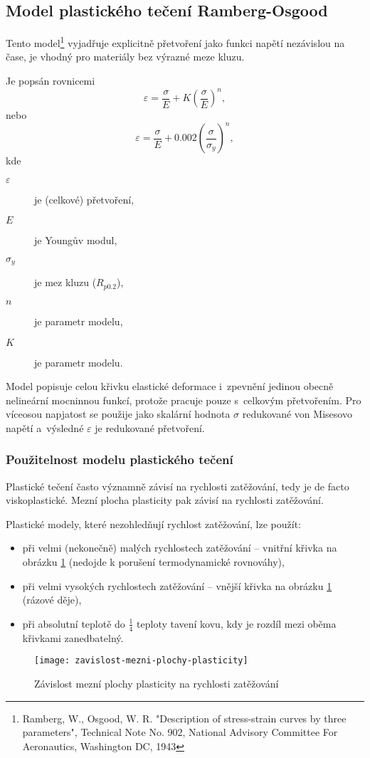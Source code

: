
\subsection{Model plastického tečení Ramberg-Osgood}\label{sec:ramberg-osgood}
Tento model\footnote{Ramberg, W., Osgood, W. R. "Description of stress-strain curves by three parameters", Technical Note No. 902, National Advisory Committee For Aeronautics, Washington DC, 1943} vyjadřuje explicitně přetvoření jako funkci napětí nezávislou na čase, je vhodný pro materiály bez výrazné meze kluzu.

Je popsán rovnicemi
\begin{equation}
	\varepsilon = \frac{\sigma}{E} + K \left( \frac{\sigma}{E} \right)^n,
\end{equation}
nebo
\begin{equation}
	\varepsilon = \frac{\sigma}{E} + 0.002 \left( \frac{\sigma}{\sigma_y} \right)^n,
\end{equation}
kde
\begin{description}
	\item[$\varepsilon$] je (celkové) přetvoření,
	\item[$E$] je Youngův modul,
	\item[$\sigma_y$] je mez kluzu ($R_{p0.2}$),
	\item[$n$] je parametr modelu,
	\item[$K$] je parametr modelu.
\end{description}

Model popisuje celou křivku elastické deformace i~zpevnění jedinou obecně nelineární mocninnou funkcí, protože pracuje pouze s~celkovým přetvořením.
Pro víceosou napjatost se použije jako skalární hodnota $\sigma$ redukované von Misesovo napětí a~výsledné $\varepsilon$ je redukované přetvoření.

\subsubsection{Použitelnost modelu plastického tečení}
Plastické tečení často významně závisí na rychlosti zatěžování, tedy je de facto viskoplastické.
Mezní plocha plasticity pak závisí na rychlosti zatěžování.

Plastické modely, které nezohledňují rychlost zatěžování, lze použít:
\begin{itemize}
	\item při velmi (nekonečně) malých rychlostech zatěžování -- vnitřní křivka na obrázku \ref{fig:mezni_plocha_plasticity} (nedojde k porušení termodynamické rovnováhy),
	\item při velmi vysokých rychlostech zatěžování -- vnější křivka na obrázku \ref{fig:mezni_plocha_plasticity} (rázové děje),
	\item při absolutní teplotě do $\frac{1}{4}$ teploty tavení kovu, kdy je rozdíl mezi oběma křivkami zanedbatelný.
\end{itemize}

\begin{figure}[H]
	\centering
	\texttt{[image: zavislost-mezni-plochy-plasticity]}
	\caption{Závislost mezní plochy plasticity na rychlosti zatěžování}
	\label{fig:mezni_plocha_plasticity}
\end{figure}
